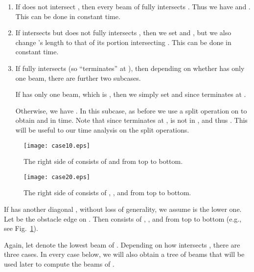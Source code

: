 \documentclass[english,runningheads,11pt]{llncs-revised}
\begin{document}
\begin{enumerate}
\item
If  does not intersect , then every beam of  fully
intersects . Thus we have  and . This can be done in constant time.

\item
If  intersects  but does not fully intersects , then we
set  and , but we also change 's length to that of its
portion intersecting .
This can be done in constant time.

\item
If  fully intersects  (so  ``terminates'' at ), then depending on whether  has only one beam, there are further two subcases.

If  has only one beam, which is , then we simply set  and  since  terminates at .

Otherwise, we have . In this subcase, as before we use a split
operation on  to obtain  and  in  time.
Note that since  terminates at ,  is not in , and thus
. This will be useful to our time analysis on the split operations.
\end{enumerate}


\begin{figure}[t]
\begin{minipage}[t]{0.49\linewidth}
\begin{center}
\texttt{[image: case10.eps]}
\caption{\footnotesize The right side  of  consists of  and  from top to bottom.}
\label{fig:case10}
\end{center}
\end{minipage}
\hspace*{0.02in}
\begin{minipage}[t]{0.49\linewidth}
\begin{center}
\texttt{[image: case20.eps]}
\caption{\footnotesize The right side  of  consists of , , and  from top to bottom.  }
\label{fig:case20}
\end{center}
\end{minipage}
\vspace{-0.15in}
\end{figure}

If  has another diagonal ,
without loss of generality, we assume  is the lower one.
Let  be the obstacle edge on . Then   consists of ,
, and  from top to bottom (e.g., see Fig.~\ref{fig:case20}).

Again, let  denote the lowest beam of . Depending on how 
intersects , there are three cases. In every case below, we will also obtain a tree 
of beams that will be used later to compute the beams of .
\end{document}
